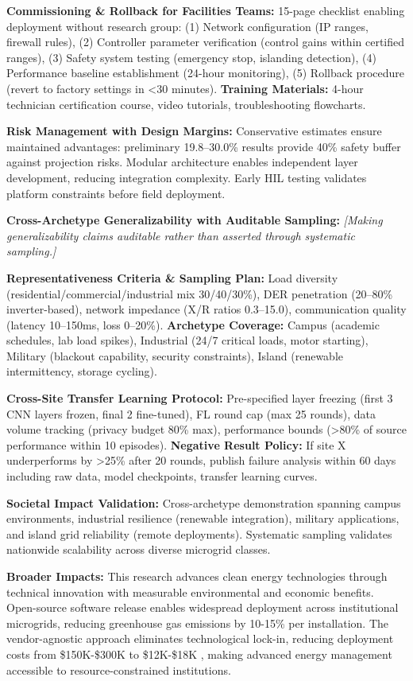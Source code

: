 \documentclass[12pt]{article}
\begin{document}
\textbf{Commissioning \& Rollback for Facilities Teams:} 15-page checklist enabling deployment without research group: (1) Network configuration (IP ranges, firewall rules), (2) Controller parameter verification (control gains within certified ranges), (3) Safety system testing (emergency stop, islanding detection), (4) Performance baseline establishment (24-hour monitoring), (5) Rollback procedure (revert to factory settings in <30 minutes). \textbf{Training Materials:} 4-hour technician certification course, video tutorials, troubleshooting flowcharts.

\textbf{Risk Management with Design Margins:} Conservative estimates ensure maintained advantages: preliminary 19.8--30.0\% results provide 40\% safety buffer against projection risks. Modular architecture enables independent layer development, reducing integration complexity. Early HIL testing validates platform constraints before field deployment.

\textbf{Cross-Archetype Generalizability with Auditable Sampling:} \textit{[Making generalizability claims auditable rather than asserted through systematic sampling.]} 

\textbf{Representativeness Criteria \& Sampling Plan:} Load diversity (residential/commercial/industrial mix 30/40/30\%), DER penetration (20--80\% inverter-based), network impedance (X/R ratios 0.3--15.0), communication quality (latency 10--150ms, loss 0--20\%). \textbf{Archetype Coverage:} Campus (academic schedules, lab load spikes), Industrial (24/7 critical loads, motor starting), Military (blackout capability, security constraints), Island (renewable intermittency, storage cycling).

\textbf{Cross-Site Transfer Learning Protocol:} Pre-specified layer freezing (first 3 CNN layers frozen, final 2 fine-tuned), FL round cap (max 25 rounds), data volume tracking (privacy budget 80\% max), performance bounds (>80\% of source performance within 10 episodes). \textbf{Negative Result Policy:} If site X underperforms by >25\% after 20 rounds, publish failure analysis within 60 days including raw data, model checkpoints, transfer learning curves.

\textbf{Societal Impact Validation:} Cross-archetype demonstration spanning campus environments, industrial resilience (renewable integration), military applications, and island grid reliability (remote deployments). Systematic sampling validates nationwide scalability across diverse microgrid classes.

\textbf{Broader Impacts:} This research advances clean energy technologies through technical innovation with measurable environmental and economic benefits. Open-source software release enables widespread deployment across institutional microgrids, reducing greenhouse gas emissions by 10-15\% per installation. The vendor-agnostic approach eliminates technological lock-in, reducing deployment costs from \$150K-\$300K to \$12K-\$18K \cite{our2024economic}, making advanced energy management accessible to resource-constrained institutions.
\end{document}

